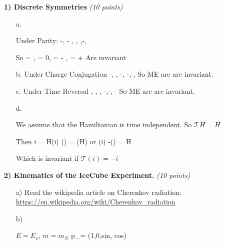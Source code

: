 {\large

\textbf{1) Discrete Symmetries } \hfill \textit{(10 points)}\\

\begin{itemize}
\item[a.]{ Under Parity:
\be
  \rightarrow -, \vec{\triangledown} \rightarrow - \vec{\triangledown}, \rho \rightarrow \rho,  \rightarrow{},\rightarrow-,  \rightarrow {}
\ee

So 
\be
 \vec{\triangledown} \cdot {} = \rho,  \vec{\triangledown} \cdot {} = 0,   \vec{\triangledown} \times {} = - ,  \vec{\triangledown} \times {} =  + 
\ee
Are invariant
}
\item[b.]{ Under Charge Conjugation
\be
  \rightarrow -, \vec{\triangledown} \rightarrow \vec{\triangledown}, \rho \rightarrow -\rho,  \rightarrow -,\rightarrow-,  \rightarrow {}
\ee
So ME are are invariant.
}
\item[c.]{ Under Time Reversal
\be
  \rightarrow {}, \vec{\triangledown} \rightarrow \vec{\triangledown}, \rho \rightarrow \rho,  \rightarrow -,\rightarrow-,  \rightarrow -
\ee
So ME are are invariant.
}
\item[d.]{ 
We assume that the Hamiltonian is time independent.  So $\mathcal{T}H = H$

Then
\be
i \psi = H\psi   \rightarrow {}(i) ()  \psi = (H)\psi
\ee
or
\be
 (i) -()  \psi = H\psi
\ee

Which is invariant if $\mathcal{T}(i) = -i$
}
\end{itemize}

\vspace*{0.25in}


\textbf{2) Kinematics of the IceCube Experiment. } \hfill \textit{(10 points)}\\

\begin{itemize}
\item[a)]{Read the wikipedia article on Cherenkov radiation:  \href{https://en.wikipedia.org/wiki/Cherenkov_radiation}{https://en.wikipedia.org/wiki/Cherenkov\_radiation}}
\item[b)]{
$E = E_{\nu}$, $m = m_N$ 
\be
p_\mu = (1,0,sin\theta, cos\theta)
\ee

}
\end{itemize}}
